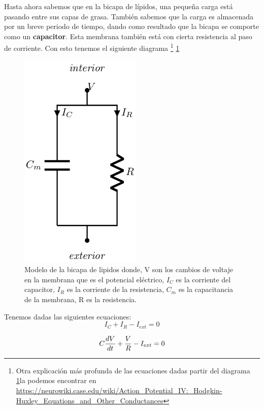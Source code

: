 Hasta ahora sabemos que en la bicapa de lípidos, una pequeña carga está pasando entre sus capas de grasa. También sabemos que la carga es almacenada por un breve periodo de tiempo, dando como resultado que la bicapa se comporte como un \textbf{capacitor}. Esta membrana también está con cierta resistencia al paso de corriente. Con esto tenemos el siguiente diagrama \footnote{Otra explicación más profunda de las ecuaciones dadas partir del diagrama \ref{fig:circuitoP}la podemos encontrar en \url{https://neurowiki.case.edu/wiki/Action_Potential_IV:_Hodgkin-Huxley_Equations_and_Other_Conductances}} \ref{fig:circuitoP}

\begin{figure}[h]
 \centering
 \includegraphics[scale=0.5]{../Figuras/bicapaLipidos.png}
 \caption{Modelo de la bicapa de lipidos donde, V son los cambios de voltaje en la membrana que es el potencial eléctrico, \(I_{C}\) es la corriente del capacitor, \(I_{R}\) es la corriente de la resistencia, \(C_{m}\) es la capacitancia de la membrana, R es la resistencia.}
 \label{fig:circuitoP}
\end{figure}

Tenemos dadas las siguientes ecuaciones:
\begin{equation}
    I_{C} + I_{R} - I_{ext} = 0
  \label{eq:bicapa1}
\end{equation}

\begin{equation}
    C\dfrac{dV}{dt} + \dfrac{V}{R} - I_{ext} = 0 \\
  \label{eq:bicapa2}
\end{equation}

